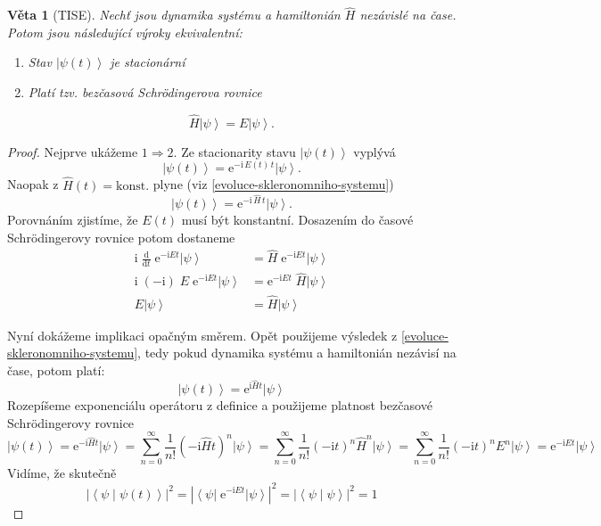 \documentclass[10pt,a4paper]{article}
\newtheorem{theorem}{Věta}[section]
\theoremstyle{definition}
\newcommand{\const}[1]{\mathrm{#1}}
\newcommand{\abs}[1]{\left| #1 \right|}
\newcommand{\dd}[2]{\frac{\const{d} #1}{\const{d} #2} \;}
\newcommand{\bra}[1]{\left< #1 \right|}
\newcommand{\ket}[1]{\left| #1 \right>}
\newcommand{\braket}[2]{\left< #1 \middle| #2 \right>}
\newcommand{\e}[1]{\const{e}^{#1}}
\renewcommand{\i}{\const{i}}
\def\konst{\mathrm{konst.}}
\begin{document}
\begin{theorem}[TISE]
    Nechť jsou dynamika systému a hamiltonián $\hat H$ nezávislé na čase. Potom jsou následující výroky ekvivalentní:
    \begin{enumerate}
        \item Stav $\ket{\psi(t)}$ je stacionární
        \item Platí tzv. bezčasová Schrödingerova rovnice
    \end{enumerate}
    \begin{equation*}
        \hat{H} \ket{\psi} = E \ket{\psi}.
    \end{equation*}
\end{theorem}
\begin{proof}
    Nejprve ukážeme $1 \Rightarrow 2$. Ze stacionarity stavu $\ket{\psi(t)}$ vyplývá
    \begin{equation*}
        \ket{\psi(t)} = \e{-\i \, E(t) \, t} \ket{\psi}.
    \end{equation*}
    Naopak z $\hat H(t) = \konst$ plyne (viz \ref{evoluce-skleronomniho-systemu})
    \begin{equation*}
        \ket{\psi(t)} = \e{-\i \, \hat H \, t} \ket{\psi}.
    \end{equation*}
    Porovnáním zjistíme, že $E(t)$ musí být konstantní. Dosazením do časové Schrödingerovy rovnice potom dostaneme
    \begin{align*}
        \i \; \dd{}{t} \! \e{-\i E t} \ket{\psi}
        &= \hat H \; \e{-\i E t} \ket{\psi}
        \\
        \i \; (-\i) \; E \; \e{-\i E t} \ket{\psi}
        &= \e{-\i E t} \; \hat H \ket{\psi}
        \\
        E \ket{\psi}
        &= \hat H \ket{\psi}
    \end{align*}

    Nyní dokážeme implikaci opačným směrem. Opět použijeme výsledek z \ref{evoluce-skleronomniho-systemu}, tedy pokud dynamika systému a hamiltonián nezávisí na čase, potom platí:
    \begin{equation*}
        \ket{\psi(t)} = \e{\i \hat H t} \ket{\psi}
    \end{equation*}
    Rozepíšeme exponenciálu operátoru z definice a použijeme platnost bezčasové Schrödingerovy rovnice
    \begin{equation*}
        \ket{\psi(t)}
        = \e{-\i \hat H t} \ket{\psi}
        = \sum_{n = 0}^\infty \frac{1}{n!} (-\i \hat H t)^n \ket{\psi}
        = \sum_{n = 0}^\infty \frac{1}{n!} (-\i t)^n \hat H^n \ket{\psi}
        = \sum_{n = 0}^\infty \frac{1}{n!}(-\i t)^n E^n \ket{\psi}
        = \e{-\i E t} \ket{\psi}
    \end{equation*}
    Vidíme, že skutečně
    \begin{equation*}
        \abs{\braket{\psi}{\psi(t)}}^2
        = \abs{\bra{\psi} \; \e{-\i E t} \ket{\psi}}^2
        = \abs{\braket{\psi}{\psi}}^2
        = 1
    \end{equation*}
\end{proof}
\end{document}
